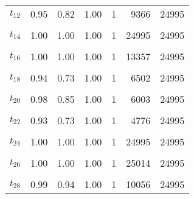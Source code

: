 \begin{longtable}[t]{lrrrrrr}
$t_{12}$ & 0.95 & 0.82 & 1.00 & 1 & 9366 & 24995\\
\cellcolor{gray!6}{$t_{13}$} & \cellcolor{gray!6}{1.00} & \cellcolor{gray!6}{1.00} & \cellcolor{gray!6}{1.00} & \cellcolor{gray!6}{1} & \cellcolor{gray!6}{21494} & \cellcolor{gray!6}{24995}\\
$t_{14}$ & 1.00 & 1.00 & 1.00 & 1 & 24995 & 24995\\
\cellcolor{gray!6}{$t_{15}$} & \cellcolor{gray!6}{0.96} & \cellcolor{gray!6}{0.80} & \cellcolor{gray!6}{1.00} & \cellcolor{gray!6}{1} & \cellcolor{gray!6}{8495} & \cellcolor{gray!6}{24995}\\
$t_{16}$ & 1.00 & 1.00 & 1.00 & 1 & 13357 & 24995\\
\cellcolor{gray!6}{$t_{17}$} & \cellcolor{gray!6}{0.98} & \cellcolor{gray!6}{0.88} & \cellcolor{gray!6}{1.00} & \cellcolor{gray!6}{1} & \cellcolor{gray!6}{13095} & \cellcolor{gray!6}{24995}\\
$t_{18}$ & 0.94 & 0.73 & 1.00 & 1 & 6502 & 24995\\
\cellcolor{gray!6}{$t_{19}$} & \cellcolor{gray!6}{1.00} & \cellcolor{gray!6}{1.00} & \cellcolor{gray!6}{1.00} & \cellcolor{gray!6}{1} & \cellcolor{gray!6}{24995} & \cellcolor{gray!6}{24995}\\
$t_{20}$ & 0.98 & 0.85 & 1.00 & 1 & 6003 & 24995\\
\cellcolor{gray!6}{$t_{21}$} & \cellcolor{gray!6}{0.91} & \cellcolor{gray!6}{0.74} & \cellcolor{gray!6}{1.00} & \cellcolor{gray!6}{1} & \cellcolor{gray!6}{7691} & \cellcolor{gray!6}{24995}\\
$t_{22}$ & 0.93 & 0.73 & 1.00 & 1 & 4776 & 24995\\
\cellcolor{gray!6}{$t_{23}$} & \cellcolor{gray!6}{0.97} & \cellcolor{gray!6}{0.83} & \cellcolor{gray!6}{1.00} & \cellcolor{gray!6}{1} & \cellcolor{gray!6}{9624} & \cellcolor{gray!6}{24995}\\
$t_{24}$ & 1.00 & 1.00 & 1.00 & 1 & 24995 & 24995\\
\cellcolor{gray!6}{$t_{25}$} & \cellcolor{gray!6}{0.97} & \cellcolor{gray!6}{0.82} & \cellcolor{gray!6}{1.00} & \cellcolor{gray!6}{1} & \cellcolor{gray!6}{7967} & \cellcolor{gray!6}{24995}\\
$t_{26}$ & 1.00 & 1.00 & 1.00 & 1 & 25014 & 24995\\
\cellcolor{gray!6}{$t_{27}$} & \cellcolor{gray!6}{0.97} & \cellcolor{gray!6}{0.84} & \cellcolor{gray!6}{1.00} & \cellcolor{gray!6}{1} & \cellcolor{gray!6}{11491} & \cellcolor{gray!6}{24995}\\
$t_{28}$ & 0.99 & 0.94 & 1.00 & 1 & 10056 & 24995\\

\end{longtable}
